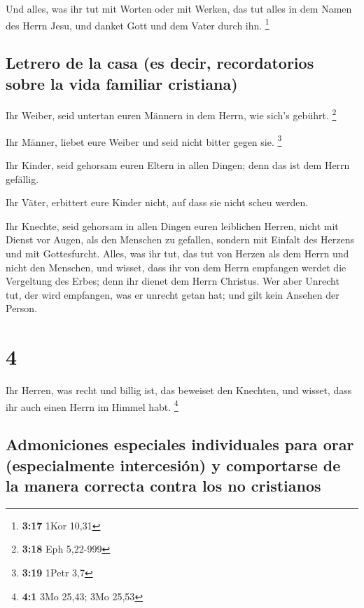  Und alles, was ihr tut mit Worten oder mit Werken, das
tut alles in dem Namen des Herrn Jesu, und danket Gott und dem Vater
durch ihn. \footnote{\textbf{3:17} 1Kor 10,31}

\hypertarget{letrero-de-la-casa-es-decir-recordatorios-sobre-la-vida-familiar-cristiana}{%
\subsection{Letrero de la casa (es decir, recordatorios sobre la vida
familiar
cristiana)}\label{letrero-de-la-casa-es-decir-recordatorios-sobre-la-vida-familiar-cristiana}}

 Ihr Weiber, seid untertan euren Männern in dem Herrn,
wie sich's gebührt. \footnote{\textbf{3:18} Eph 5,22-999}

 Ihr Männer, liebet eure Weiber und seid nicht bitter
gegen sie. \footnote{\textbf{3:19} 1Petr 3,7}

 Ihr Kinder, seid gehorsam euren Eltern in allen Dingen;
denn das ist dem Herrn gefällig.

 Ihr Väter, erbittert eure Kinder nicht, auf dass sie
nicht scheu werden.

 Ihr Knechte, seid gehorsam in allen Dingen euren
leiblichen Herren, nicht mit Dienst vor Augen, als den Menschen zu
gefallen, sondern mit Einfalt des Herzens und mit Gottesfurcht.
 Alles, was ihr tut, das tut von Herzen als dem Herrn und
nicht den Menschen,  und wisset, dass ihr von dem Herrn
empfangen werdet die Vergeltung des Erbes; denn ihr dienet dem Herrn
Christus.  Wer aber Unrecht tut, der wird empfangen, was
er unrecht getan hat; und gilt kein Ansehen der Person.

\hypertarget{section-3}{%
\section{4}\label{section-3}}

 Ihr Herren, was recht und billig ist, das beweiset den
Knechten, und wisset, dass ihr auch einen Herrn im Himmel habt.
\footnote{\textbf{4:1} 3Mo 25,43; 3Mo 25,53}

\hypertarget{admoniciones-especiales-individuales-para-orar-especialmente-intercesiuxf3n-y-comportarse-de-la-manera-correcta-contra-los-no-cristianos}{%
\subsection{Admoniciones especiales individuales para orar
(especialmente intercesión) y comportarse de la manera correcta contra
los no
cristianos}\label{admoniciones-especiales-individuales-para-orar-especialmente-intercesiuxf3n-y-comportarse-de-la-manera-correcta-contra-los-no-cristianos}}

